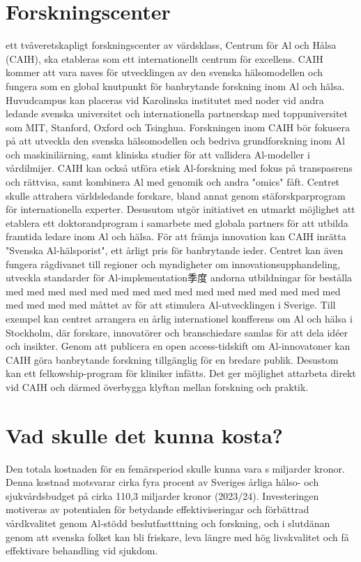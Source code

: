 {\section*{Forskningscenter}
ett tvåveretskapligt forskningscenter av värdsklass, Centrum för Al och Hålsa (CAIH), ska etableras som ett internationellt centrum för excellens. CAIH kommer att vara naves för utvecklingen av den svenska hälsomodellen och fungera som en global knutpunkt för banbrytande forskning inom Al och hälsa. Huvudcampus kan placeras vid Karolinska institutet med noder vid andra ledande svenska universitet och internationella partnerskap med toppuniversitet som MIT, Stanford, Oxford och Tsinghua.
Forskningen inom CAIH bör fokusera på att utveckla den svenska hälsomodellen och bedriva grundforskning inom Al och maskinilärning, samt kliniska studier för att vallidera Al-modeller i vårdilmijer. CAIH kan också utföra etisk Al-forskning med fokus på transpasrens och rättvisa, samt kombinera Al med genomik och andra "omics" fåft.
Centret skulle attrahera världsledande forskare, bland annat genom stäforskparprogram för internationella experter. Desusutom utgör initiativet en utmarkt möjlighet att etablera ett doktorandprogram i samarbete med globala partners för att utbilda framtida ledare inom Al och hälsa. För att främja innovation kan CAIH inrätta "Svenska Al-hälsporist", ett årligt pris för banbrytande ieder. Centret kan även fungera rågdivanet till regioner och myndigheter om innovationsupphandeling, utveckla standarder för Al-implementation季度 andorna utbildningar för bestålla med med med med med med med med med med med med med med med med med med med med måttet av för att stimulera Al-utvecklingen i Sverige. Till exempel kan centret arrangera en årlig internationel konfferens om Al och hälsa i Stockholm, där forskare, innovatörer och branschiedare samlas för att dela idéer och insikter. Genom att publicera en open access-tidskift om Al-innovatoner kan CAIH göra banbrytande forskning tillgänglig för en bredare publik. Desustom kan ett felkowship-program för kliniker infätts. Det ger möjlighet attarbeta direkt vid CAIH och därmed överbygga klyftan mellan forskning och praktik.
\section*{Vad skulle det kunna kosta?}
Den totala kostnaden för en femärsperiod skulle kunna vara s miljarder kronor.
Denna kostnad motsvarar cirka fyra procent av Sveriges årliga hälso- och sjukvårdsbudget på cirka 110,3 miljarder kronor (2023/24). Investeringen motiveras av potentialen för betydande effektiviseringar och förbättrad vårdkvalitet genom Al-stödd beslutfastttning och forskning, och i slutdänan genom att svenska folket kan bli friskare, leva längre med hög livskvalitet och få effektivare behandling vid sjukdom.
}
